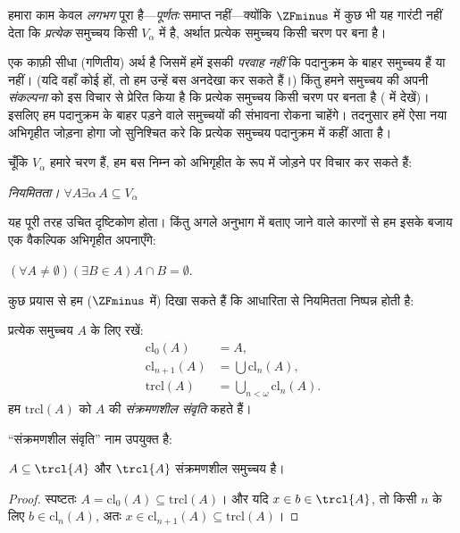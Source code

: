 \documentclass[../../../include/open-logic-section]{subfiles}
\begin{document}


हमारा काम केवल \emph{लगभग} पूरा है---\emph{पूर्णतः} समाप्त नहीं---क्योंकि
$\ZFminus$ में कुछ भी यह गारंटी नहीं देता कि \emph{प्रत्येक} समुच्चय किसी
$V_\alpha$ में है, अर्थात प्रत्येक समुच्चय किसी चरण पर बना है।

एक काफ़ी सीधा (गणितीय) अर्थ है जिसमें हमें इसकी \emph{परवाह नहीं} कि
पदानुक्रम के बाहर समुच्चय हैं या नहीं। (यदि वहाँ कोई हों, तो हम उन्हें बस
अनदेखा कर सकते हैं।) किंतु हमने समुच्चय की अपनी \emph{संकल्पना} को इस विचार
से प्रेरित किया है कि प्रत्येक समुच्चय किसी चरण पर बनता है
( में \stageshier{} देखें)। इसलिए हम पदानुक्रम के बाहर
पड़ने वाले समुच्चयों की संभावना रोकना चाहेंगे। तदनुसार हमें ऐसा नया अभिगृहीत
जोड़ना होगा जो सुनिश्चित करे कि प्रत्येक समुच्चय पदानुक्रम में कहीं आता है।

चूँकि $V_\alpha$ हमारे चरण हैं, हम बस निम्न को अभिगृहीत के रूप में जोड़ने
पर विचार कर सकते हैं:

\begin{defish}
\emph{नियमितता।} $\forall A \exists \alpha\, A \subseteq V_\alpha$
\end{defish}

यह पूरी तरह उचित दृष्टिकोण होता। किंतु अगले अनुभाग में बताए जाने वाले कारणों
से हम इसके बजाय एक वैकल्पिक अभिगृहीत अपनाएँगे:

\begin{axiom}[आधारिता]
$(\forall A \neq \emptyset)(\exists B \in A)A \cap B = \emptyset$.
\end{axiom}

कुछ प्रयास से हम ($\ZFminus$ में) दिखा सकते हैं कि आधारिता से नियमितता
निष्पन्न होती है:
\begin{defn}
प्रत्येक समुच्चय $A$ के लिए रखें:
\begin{align*}
	\text{cl}_0(A) &= A,\\
	\text{cl}_{n+1}(A) &= \bigcup \text{cl}_n(A),\\
	\text{trcl}(A) &= \bigcup_{n < \omega} \text{cl}_{n}(A).
\end{align*}
हम $\text{trcl}(A)$ को $A$ की \emph{संक्रमणशील संवृति} कहते हैं।
\end{defn}
\noindent
``संक्रमणशील संवृति'' नाम उपयुक्त है:
\begin{prop}
$A \subseteq \trcl{A}$ और $\trcl{A}$ संक्रमणशील समुच्चय है।
\end{prop}

\begin{proof}
स्पष्टतः $A = \text{cl}_0(A) \subseteq \text{trcl}(A)$। और यदि
$x \in b \in \trcl{A}$, तो किसी $n$ के लिए $b \in \text{cl}_n(A)$,
अतः $x \in \text{cl}_{n+1}(A) \subseteq \text{trcl}(A)$।
\end{proof}
\end{document}
